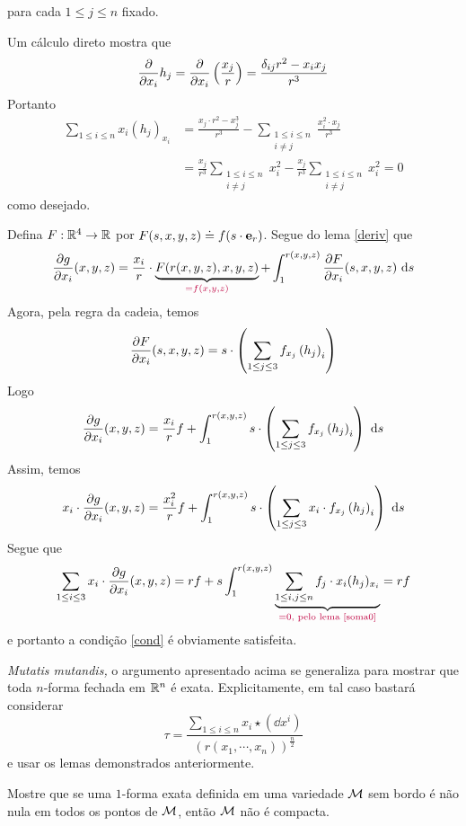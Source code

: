 \begin{dem}
\begin{lema}
{\[\]
para cada $1 \leq j \leq n$ fixado.
}
\end{lema}
\begin{demm}
Um cálculo direto mostra que
\[
\frac{\partial}{\partial x_i}  h_j = \frac{\partial}{\partial x_i} \left(\frac{x_j}{r} \right) = \frac{\delta_{ij} r^2 - x_i x_j}{r^3}
\]
Portanto
\begin{align*}
\sum_{1 \leq i \leq n} x_i \left(h_j \right)_{x_i}  &= \frac{x_j \cdot r^2 - x_j^3}{r^3} - \sum_{\substack{1 \leq i \leq n\\
i \neq j}} \frac{x_i^2 \cdot  x_j}{r^3} \\
&= \frac{x_j}{r^3} \sum_{\substack{1 \leq i \leq n\\
i \neq j}} x_i^2 - \frac{x_j}{r^3} \sum_{\substack{1 \leq i \leq n\\
i \neq j}} x_i^2 = 0
\end{align*}
como desejado.
\end{demm}
Defina $F: \mathbb{R}^4 \to \mathbb{R}$ por $F(s, x, y, z) \doteq f(s \cdot \mathbf{e}_r)$. Segue do lema \cref{deriv} que 
\[
\frac{\partial g}{\partial x_i}(x, y, z) = \frac{x_i}{r} \cdot \underbrace{F(r(x, y, z), x, y, z)}_{\textcolor{purple}{=f(x, y, z)}} + \int_{1}^{r(x, y, z)} \frac{\partial F}{\partial x_i}(s, x, y, z) \ \mathrm{d} s
\]
Agora, pela regra da cadeia, temos
\[
\frac{\partial F}{\partial x_i}(s, x, y, z) = s \cdot \left(\sum_{1 \leq j \leq 3} f_{x_j}\left(h_j \right)_i \right)
\]
Logo
\[
\frac{\partial g}{\partial x_i}(x, y, z) = \frac{x_i}{r} f + \int_{1}^{r(x, y, z)}  s \cdot \left(\sum_{1 \leq j \leq 3} f_{x_j}\left(h_j \right)_i \right) \ \mathrm{d} s
\]
Assim, temos
\[
x_i \cdot \frac{\partial g}{\partial x_i}(x, y, z) = \frac{x_i^2}{r} f + \int_{1}^{r(x, y, z)}  s \cdot \left(\sum_{1 \leq j \leq 3} x_i \cdot f_{x_j}\left(h_j \right)_i \right) \ \mathrm{d} s
\] 
Segue que
\[
\sum_{1 \leq i \leq 3} x_i \cdot \frac{\p g}{\p x_i}(x, y, z) = r f + s \int_{1}^{r(x, y, z)} \underbrace{\sum_{1 \leq i, j \leq n} f_j \cdot x_i (h_j)_{x_i}}_{\purple{=0, \text{ pelo lema \cref{soma0}}}} = rf
\]
e portanto a condição \cref{cond} é obviamente satisfeita.
\end{dem}
\begin{oobs}
\emph{Mutatis mutandis,} o argumento apresentado acima se generaliza para mostrar que toda $n$-forma fechada em $\mathbb{R}^n$ é exata. Explicitamente, em tal caso bastará considerar 
\[
\tau = \frac{\displaystyle{\sum_{1 \leq i \leq n}} x_i \star(\dd x^i)}{(r(x_1, \cdots, x_n))^{\frac{n}{2}}}
\]
e usar os lemas demonstrados anteriormente.
\end{oobs}
\begin{Mybox}
Mostre que se uma $1$-forma exata definida em uma variedade $\mathcal{M}$ sem bordo é não nula em todos os pontos de $\mathcal{M}$, então $\mathcal{M}$ não é compacta.
\vspace{-.4cm}
\end{Mybox}
\vspace{-.4cm}

